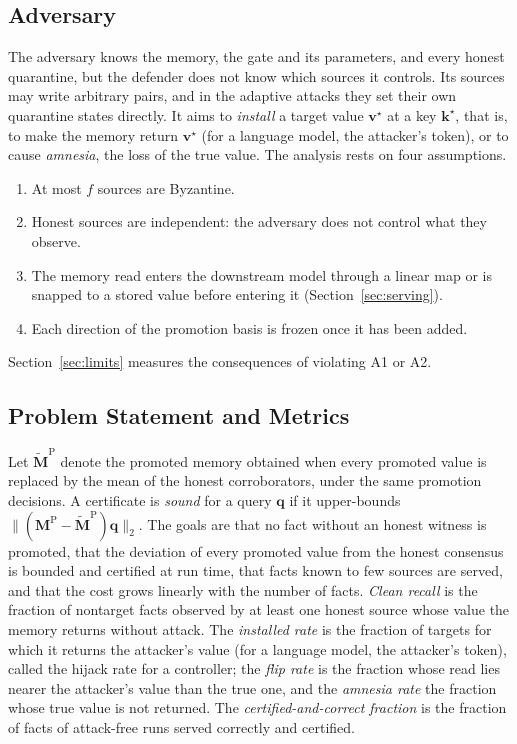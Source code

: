 \documentclass[journal]{IEEEtran}
\theoremstyle{remark}
\newcommand{\Mp}{\bm{M}^{\mathrm{P}}}
\newcommand{\Mpref}{\widetilde{\bm{M}}^{\mathrm{P}}}
\begin{document}
\subsection{Adversary}
The adversary knows the memory, the gate and its parameters, and every honest quarantine, but the defender does not know which sources it controls. Its sources may write arbitrary pairs, and in the adaptive attacks they set their own quarantine states directly. It aims to \emph{install} a target value $\bm{v}^\star$ at a key $\bm{k}^\star$, that is, to make the memory return $\bm{v}^\star$ (for a language model, the attacker's token), or to cause \emph{amnesia}, the loss of the true value. The analysis rests on four assumptions.
\begin{enumerate}
\item[A1)] At most $f$ sources are Byzantine.
\item[A2)] Honest sources are independent: the adversary does not control what they observe.
\item[A3)] The memory read enters the downstream model through a linear map or is snapped to a stored value before entering it (Section~\ref{sec:serving}).
\item[A4)] Each direction of the promotion basis is frozen once it has been added.
\end{enumerate}
Section~\ref{sec:limits} measures the consequences of violating A1 or A2.

\subsection{Problem Statement and Metrics}
Let $\Mpref$ denote the promoted memory obtained when every promoted value is replaced by the mean of the honest corroborators, under the same promotion decisions. A certificate is \emph{sound} for a query $\bm{q}$ if it upper-bounds $\|(\Mp-\Mpref)\bm{q}\|_2$. The goals are that no fact without an honest witness is promoted, that the deviation of every promoted value from the honest consensus is bounded and certified at run time, that facts known to few sources are served, and that the cost grows linearly with the number of facts. \emph{Clean recall} is the fraction of nontarget facts observed by at least one honest source whose value the memory returns without attack. The \emph{installed rate} is the fraction of targets for which it returns the attacker's value (for a language model, the attacker's token), called the hijack rate for a controller; the \emph{flip rate} is the fraction whose read lies nearer the attacker's value than the true one, and the \emph{amnesia rate} the fraction whose true value is not returned. The \emph{certified-and-correct fraction} is the fraction of facts of attack-free runs served correctly and certified.
\end{document}
